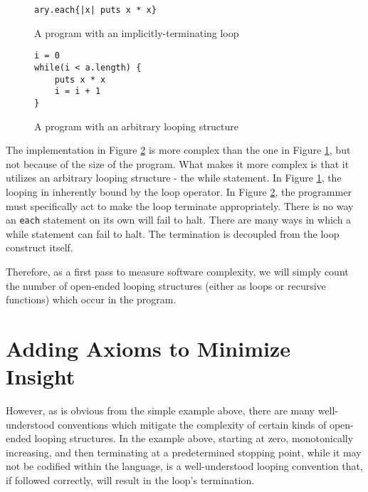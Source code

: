 \begin{figure}[H]
\begin{verbatim}
ary.each{|x| puts x * x}
\end{verbatim}
\caption{A program with an implicitly-terminating loop}
\label{fig:impterm}
\end{figure}

\begin{figure}[H]
\begin{verbatim}
i = 0
while(i < a.length) {
	puts x * x
	i = i + 1
}
\end{verbatim}
\caption{A program with an arbitrary looping structure}
\label{fig:expterm}
\end{figure}

The implementation in Figure \ref{fig:expterm} is more complex than the one in Figure \ref{fig:impterm}, but not because of the size of the program.  What makes it more complex is that it utilizes an arbitrary looping structure - the while statement.  In Figure \ref{fig:impterm}, the looping in inherently bound by the loop operator.  In Figure \ref{fig:expterm}, the programmer must specifically act to make the loop terminate appropriately.  There is no way an \verb+each+ statement on its own will fail to halt.  There are many ways in which a while statement can fail to halt.  The termination is decoupled from the loop construct itself.

Therefore, as a first pass to measure software complexity, we will simply count the number of open-ended looping structures (either as loops or recursive functions) which occur in the program.   

\section{Adding Axioms to Minimize Insight}

However, as is obvious from the simple example above, there are many well-understood conventions which mitigate the complexity of certain kinds of open-ended looping structures.  In the example above, starting at zero, monotonically increasing, and then terminating at a predetermined stopping point, while it may not be codified within the language, is a well-understood looping convention that, if followed correctly, will result in the loop's termination.


